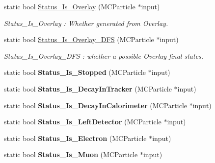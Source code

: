 \begin{DoxyCompactItemize}
static bool \hyperlink{classToolSet_1_1CMC_a9d3659a1fd4bad33a54c08769902e998}{Status\_\-Is\_\-Overlay} (MCParticle $\ast$input)
\begin{DoxyCompactList}\small\item\em Status\_\-Is\_\-Overlay : Whether generated from Overlay. \item\end{DoxyCompactList}\item 
static bool \hyperlink{classToolSet_1_1CMC_acb83c834c9e5e1c33f8c2514e4c40d93}{Status\_\-Is\_\-Overlay\_\-DFS} (MCParticle $\ast$input)
\begin{DoxyCompactList}\small\item\em Status\_\-Is\_\-Overlay\_\-DFS : whether a possible Overlay final states. \item\end{DoxyCompactList}\item 
\hypertarget{classToolSet_1_1CMC_aac0eed5c22431cfc5e9c32d9bc48b0d7}{
static bool {\bfseries Status\_\-Is\_\-Stopped} (MCParticle $\ast$input)}
\label{classToolSet_1_1CMC_aac0eed5c22431cfc5e9c32d9bc48b0d7}

\item 
\hypertarget{classToolSet_1_1CMC_a2b903f56e1a2c0635e722a47d5e3e87f}{
static bool {\bfseries Status\_\-Is\_\-DecayInTracker} (MCParticle $\ast$input)}
\label{classToolSet_1_1CMC_a2b903f56e1a2c0635e722a47d5e3e87f}

\item 
\hypertarget{classToolSet_1_1CMC_ad59fb18ae62349bf343ad165950f776a}{
static bool {\bfseries Status\_\-Is\_\-DecayInCalorimeter} (MCParticle $\ast$input)}
\label{classToolSet_1_1CMC_ad59fb18ae62349bf343ad165950f776a}

\item 
\hypertarget{classToolSet_1_1CMC_ac893a50b848486f2ebfcdc877c148491}{
static bool {\bfseries Status\_\-Is\_\-LeftDetector} (MCParticle $\ast$input)}
\label{classToolSet_1_1CMC_ac893a50b848486f2ebfcdc877c148491}

\item 
\hypertarget{classToolSet_1_1CMC_a3d78b61ff25d63169a4bb76f2b3b1268}{
static bool {\bfseries Status\_\-Is\_\-Electron} (MCParticle $\ast$input)}
\label{classToolSet_1_1CMC_a3d78b61ff25d63169a4bb76f2b3b1268}

\item 
\hypertarget{classToolSet_1_1CMC_aa3543a71f0c9b7822dc45df8d7820e1b}{
static bool {\bfseries Status\_\-Is\_\-Muon} (MCParticle $\ast$input)}
\label{classToolSet_1_1CMC_aa3543a71f0c9b7822dc45df8d7820e1b}


\end{DoxyCompactItemize}
